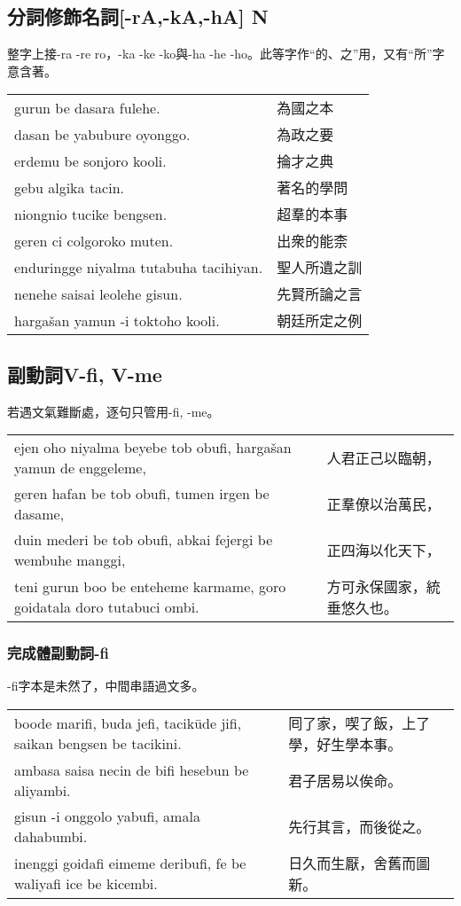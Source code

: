 \documentclass{article}
\begin{document}
\subsection{分詞修飾名詞[-rA,-kA,-hA] N}
\noindent 整字上接-ra -re ro，-ka -ke -ko與-ha -he -ho。此等字作“的、之”用，又有“所”字意含著。
\begin{center}
    \begin{tabularx}{\textwidth}{XX}
        gurun be dasara fulehe. & 為國之本\\
        dasan be yabubure oyonggo. & 為政之要\\
        erdemu be sonjoro kooli. & 掄才之典\\
        gebu algika tacin. & 著名的學問\\
        niongnio tucike bengsen. & 超羣的本事\\
        geren ci colgoroko muten. & 出衆的能柰\\
        enduringge niyalma tutabuha tacihiyan. & 聖人所遺之訓\\
        nenehe saisai leolehe gisun. & 先賢所論之言\\
        harga\v{s}an yamun -i toktoho kooli. & 朝廷所定之例
    \end{tabularx}
\end{center}

\subsection{副動詞V-fi, V-me}
\noindent 若遇文氣難斷處，逐句只管用-fi, -me。
\begin{center}
    \begin{tabularx}{\textwidth}{XX}
        ejen oho niyalma beyebe tob obufi, harga\v{s}an yamun de enggeleme, & 人君正己以臨朝，\\
        geren hafan be tob obufi, tumen irgen be dasame, & 正羣僚以治萬民，\\
        duin mederi be tob obufi, abkai fejergi be wembuhe manggi, & 正四海以化天下，\\
        teni gurun boo be enteheme karmame, goro goidatala doro tutabuci ombi. & 方可永保國家，統垂悠久也。
    \end{tabularx}
\end{center}

\subsubsection{完成體副動詞-fi}
\noindent -fi字本是未然了，中間串語過文多。
\begin{center}
    \begin{tabularx}{\textwidth}{XX}
        boode marifi, buda jefi, tacik\={u}de jifi, saikan bengsen be tacikini. & 囘了家，喫了飯，上了學，好生學本事。\\
        ambasa saisa necin de bifi hesebun be aliyambi. & 君子居易以俟命。\\
        gisun -i onggolo yabufi, amala dahabumbi. & 先行其言，而後從之。\\
        inenggi goidafi eimeme deribufi, fe be waliyafi ice be kicembi. & 日久而生厭，舍舊而圖新。
    \end{tabularx}
\end{center}
\end{document}
